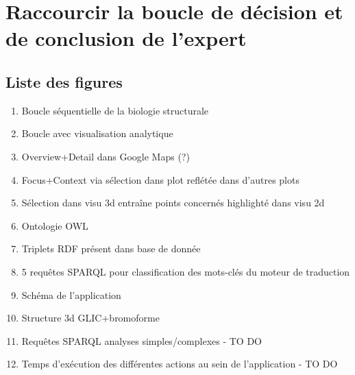 \chapter[Lier l'analyse à la visualisation dans un même espace de travail]{Raccourcir la boucle de décision et de conclusion de l'expert}
\label{Sec:visuAna}
\minitoc
\cleardoublepage

% 



\section{Liste des figures}

\begin{enumerate}
	\item Boucle séquentielle de la biologie structurale
	\item Boucle avec visualisation analytique
	\item Overview+Detail dans Google Maps (?)
	\item Focus+Context via sélection dans plot reflétée dans d'autres plots
	\item Sélection dans visu 3d entraîne points concernés highlighté dans visu 2d
	\item Ontologie OWL
	\item Triplets RDF présent dans base de donnée
	\item 5 requêtes SPARQL pour classification des mots-clés du moteur de traduction
	\item Schéma de l'application
	\item Structure 3d GLIC+bromoforme
	\item Requêtes SPARQL analyses simples/complexes - TO DO
	\item Temps d'exécution des différentes actions au sein de l'application - TO DO
\end{enumerate}

